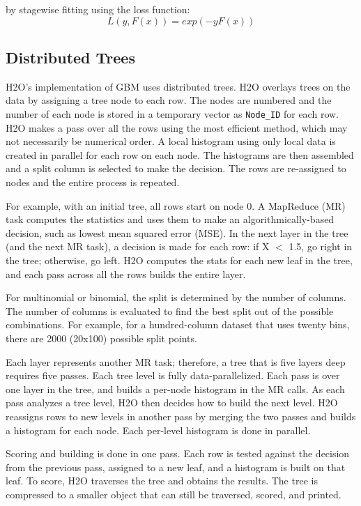 by stagewise fitting using the loss function:
$$L(y, F(x)) = exp(-y  F (x)) $$


\subsection{Distributed Trees}

H2O's implementation of GBM uses distributed trees. H2O overlays trees on the data by assigning a tree node to each row.
The nodes are numbered and the number of each node is stored in a temporary vector as {\texttt{Node\_ID}} for each row. H2O makes a pass over all the rows using the most efficient method, which may not necessarily be  numerical order. A local
histogram using only local data is created in parallel for each row on each node. The histograms are then assembled and a split column is selected to make the decision. The rows are re-assigned to nodes and the entire process is repeated.

For example, with an initial tree, all rows start on node 0. A MapReduce (MR) task computes the statistics and uses
them to make an algorithmically-based decision, such as lowest mean squared error (MSE). In the next layer in the
tree (and the next MR task), a decision is made for each row: if X $<$ 1.5, go right in the tree; otherwise, go left.
H2O computes the stats for each new leaf in the tree, and each pass across all the rows builds the entire layer.

For multinomial or binomial, the split is determined by the number of columns. The number of columns is evaluated to
find the best split out of the possible combinations. For example, for a hundred-column dataset that uses twenty bins,
there are 2000 (20x100) possible split points.

Each layer represents another MR task; therefore, a tree that is five layers deep requires five passes. Each tree
level is fully data-parallelized. Each pass is over one layer in the tree, and builds a per-node histogram in the
MR calls. As each pass analyzes a tree level, H2O then decides how to build the next level. H2O reassigns rows to
new levels in another pass by merging the two passes and builds a histogram for each node. Each per-level histogram
is done in parallel.

Scoring and building is done in one pass. Each row is tested against the decision from the previous pass, assigned
to a new leaf, and a histogram is built on that leaf. To score, H2O traverses the tree and obtains the results. The
tree is compressed to a smaller object that can still be traversed, scored, and printed.

